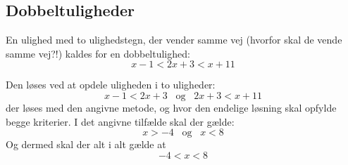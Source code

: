 \documentclass[12pt,oneside,a4paper]{article}
\begin{document}
\subsection{Dobbeltuligheder}
En ulighed med to ulighedstegn, der vender samme vej (hvorfor skal de vende samme vej?!) kaldes for en dobbeltulighed:
$$
x-1 < 2x + 3 < x+11
$$

Den løses ved at opdele uligheden i to uligheder:
$$
x - 1 < 2x + 3 \;\;\; \text{og} \;\;\; 2x + 3 < x + 11
$$
der løses med den angivne metode, og hvor den endelige løsning skal opfylde begge kriterier. I det angivne tilfælde skal der gælde:
$$
x>-4 \;\;\; \text{og} \;\;\; x<8
$$
Og dermed skal der alt i alt gælde at
$$
-4 < x < 8
$$
\end{document}

